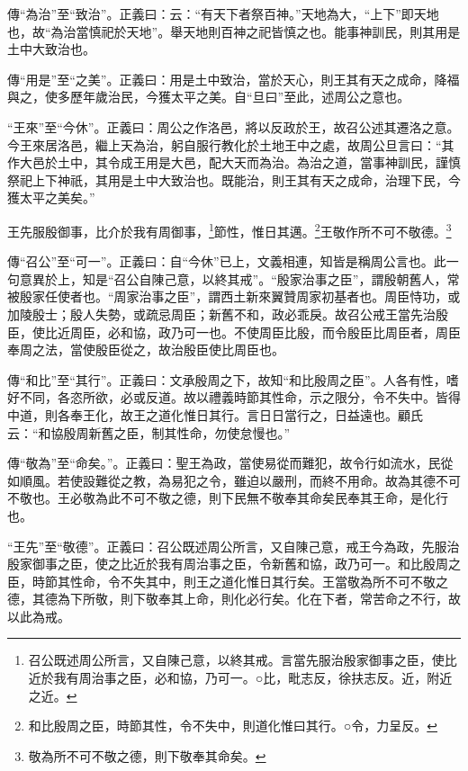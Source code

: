 {\noindent\zhuan{}\fzbyks 傳“為治”至“致治”。正義曰：云：“有天下者祭百神。”天地為大，“上下”即天地也，故“為治當慎祀於天地”。舉天地則百神之祀皆慎之也。能事神訓民，則其用是土中大致治也。 \par}

{\noindent\zhuan{}\fzbyks 傳“用是”至“之美”。正義曰：用是土中致治，當於天心，則王其有天之成命，降福與之，使多歷年歲治民，今獲太平之美。自“旦曰”至此，述周公之意也。 \par}

{\noindent\shu{}\fzkt “王來”至“今休”。正義曰：周公之作洛邑，將以反政於王，故召公述其遷洛之意。今王來居洛邑，繼上天為治，躬自服行教化於土地王中之處，故周公旦言曰：“其作大邑於土中，其令成王用是大邑，配大天而為治。為治之道，當事神訓民，謹慎祭祀上下神祇，其用是土中大致治也。既能治，則王其有天之成命，治理下民，今獲太平之美矣。” \par}

王先服殷御事，比介於我有周御事，\footnote{召公既述周公所言，又自陳己意，以終其戒。言當先服治殷家御事之臣，使比近於我有周治事之臣，必和協，乃可一。○比，毗志反，徐扶志反。近，附近之近。}節性，惟日其邁。\footnote{和比殷周之臣，時節其性，令不失中，則道化惟曰其行。○令，力呈反。}王敬作所不可不敬德。\footnote{敬為所不可不敬之德，則下敬奉其命矣。}


{\noindent\zhuan{}\fzbyks 傳“召公”至“可一”。正義曰：自“今休”已上，文義相連，知皆是稱周公言也。此一句意異於上，知是“召公自陳己意，以終其戒”。“殷家治事之臣”，謂殷朝舊人，常被殷家任使者也。“周家治事之臣”，謂西土新來翼贊周家初基者也。周臣恃功，或加陵殷士；殷人失勢，或疏忌周臣；新舊不和，政必乖戾。故召公戒王當先治殷臣，使比近周臣，必和協，政乃可一也。不使周臣比殷，而令殷臣比周臣者，周臣奉周之法，當使殷臣從之，故治殷臣使比周臣也。 \par}

{\noindent\zhuan{}\fzbyks 傳“和比”至“其行”。正義曰：文承殷周之下，故知“和比殷周之臣”。人各有性，嗜好不同，各恣所欲，必或反道。故以禮義時節其性命，示之限分，令不失中。皆得中道，則各奉王化，故王之道化惟日其行。言日日當行之，日益遠也。顧氏云：“和協殷周新舊之臣，制其性命，勿使怠慢也。” \par}

{\noindent\zhuan{}\fzbyks 傳“敬為”至“命矣。”。正義曰：聖王為政，當使易從而難犯，故令行如流水，民從如順風。若使設難從之教，為易犯之令，雖迫以嚴刑，而終不用命。故為其德不可不敬也。王必敬為此不可不敬之德，則下民無不敬奉其命矣民奉其王命，是化行也。 \par}

{\noindent\shu{}\fzkt “王先”至“敬德”。正義曰：召公既述周公所言，又自陳己意，戒王今為政，先服治殷家御事之臣，使之比近於我有周治事之臣，令新舊和協，政乃可一。和比殷周之臣，時節其性命，令不失其中，則王之道化惟日其行矣。王當敬為所不可不敬之德，其德為下所敬，則下敬奉其上命，則化必行矣。化在下者，常苦命之不行，故以此為戒。 \par}

